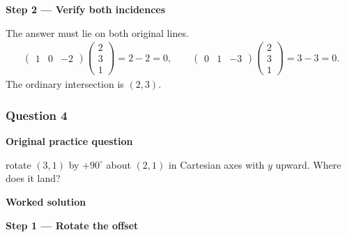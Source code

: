 \documentclass[letterpaper,11pt,english,openany,oneside]{jupyterBook}
\begin{document}
\par\medskip{}
{\color{QuizStepRed}\bfseries Step 2 — Verify both incidences}\par\smallskip

\sphinxAtStartPar
{} The answer must lie on both original lines.
{\color{QuizMathBlue} \begin{equation*}
\begin{split}
\begin{pmatrix}1&0&-2\end{pmatrix}\begin{pmatrix}2\\3\\1\end{pmatrix}=2-2=0,\qquad \begin{pmatrix}0&1&-3\end{pmatrix}\begin{pmatrix}2\\3\\1\end{pmatrix}=3-3=0.
\end{split}
\end{equation*}}
\sphinxAtStartPar
The ordinary intersection is {\color{QuizMathBlue} \((2,3)\)}.

\par

\par\medskip


\subsubsection{Question 4}
\label{\detokenize{lectures/lecture01/tldr:question-4}}\label{\detokenize{lectures/lecture01/tldr:lec01-tldr-q4}}
\par\medskip\textbf{Original practice question}\par\smallskip

\sphinxAtStartPar
{} rotate \((3,1)\) by \(+90^\circ\) about \((2,1)\) in Cartesian axes with \(y\) upward. Where does it land?

\par\medskip

\par\medskip
\textbf{Worked solution}\par\smallskip

\par\medskip{}
{\color{QuizStepRed}\bfseries Step 1 — Rotate the offset}\par\smallskip
\end{document}

